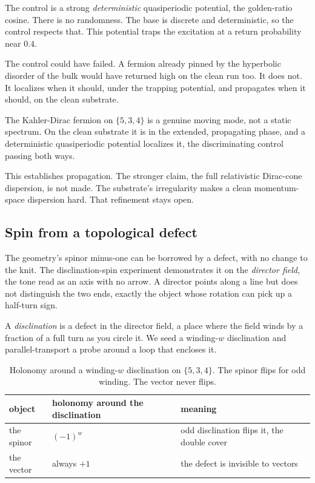 The control is a strong \emph{deterministic} quasiperiodic potential, the golden-ratio cosine. There is no randomness. The base is discrete and deterministic, so the control respects that. This potential traps the excitation at a return probability near $0.4$.

The control could have failed. A fermion already pinned by the hyperbolic disorder of the bulk would have returned high on the clean run too. It does not. It localizes when it should, under the trapping potential, and propagates when it should, on the clean substrate.

\begin{result}
The Kahler-Dirac fermion on $\{5,3,4\}$ is a genuine moving mode, not a static spectrum. On the clean substrate it is in the extended, propagating phase, and a deterministic quasiperiodic potential localizes it, the discriminating control passing both ways.
\end{result}

This establishes propagation. The stronger claim, the full relativistic Dirac-cone dispersion, is not made. The substrate's irregularity makes a clean momentum-space dispersion hard. That refinement stays open.

\subsection{Spin from a topological defect}

The geometry's spinor minus-one can be borrowed by a defect, with no change to the knit. The disclination-spin experiment demonstrates it on the \emph{director field}, the tone read as an axis with no arrow. A director points along a line but does not distinguish the two ends, exactly the object whose rotation can pick up a half-turn sign.

A \emph{disclination} is a defect in the director field, a place where the field winds by a fraction of a full turn as you circle it. We seed a winding-$w$ disclination and parallel-transport a probe around a loop that encloses it.

\begin{table}[ht]
\centering
\begin{tabular}{@{}lll@{}}
\toprule
object & holonomy around the disclination & meaning \\
\midrule
the spinor & $(-1)^{w}$ & odd disclination flips it, the double cover \\
the vector & always $+1$ & the defect is invisible to vectors \\
\bottomrule
\end{tabular}
\caption{Holonomy around a winding-$w$ disclination on $\{5,3,4\}$. The spinor flips for odd winding. The vector never flips.}
\label{tab:disclination-534}
\end{table}

